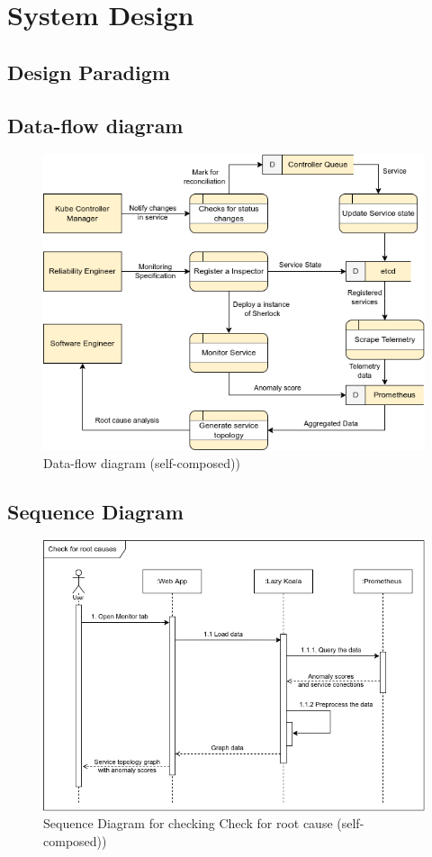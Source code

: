 \section{System Design}

\subsection{Design Paradigm}

\subsection{Data-flow diagram}
\begin{figure}[H]
    \includegraphics[width=14cm]{assets/system-design/data-flow.png}
    \caption{Data-flow diagram (self-composed))}
    \label{fig:data-flow}
\end{figure}

\subsection{Sequence Diagram}

\begin{figure}[H]
    \includegraphics[width=14cm]{assets/system-design/sequence-diagram-1.png}
    \caption{Sequence Diagram for checking Check for root cause (self-composed))}
\end{figure}

